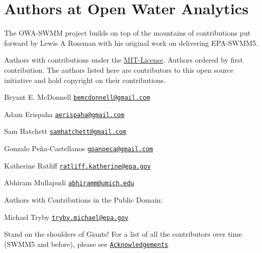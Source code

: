 \hypertarget{group___a_u_t_h_o_r_s}{}\section{Authors at Open Water Analytics}
\label{group___a_u_t_h_o_r_s}
The O\+W\+A-\/\+S\+W\+MM project builds on top of the mountains of contributions put forward by Lewis A Rossman with his original work on delivering E\+P\+A-\/\+S\+W\+M\+M5.

Authors with contributions under the \hyperlink{group___m_i_t-_license}{M\+I\+T-\/\+License}. Authors ordered by first contribution. The authors listed here are contributors to this open source initiative and hold copyright on their contributions.


\begin{DoxyItemize}
\item Bryant E. Mc\+Donnell \href{mailto:bemcdonnell@gmail.com}{\tt bemcdonnell@gmail.\+com}
\item Adam Erispaha \href{mailto:aerispaha@gmail.com}{\tt aerispaha@gmail.\+com}
\item Sam Hatchett \href{mailto:samhatchett@gmail.com}{\tt samhatchett@gmail.\+com}
\item Gonzalo Peña-\/\+Castellanos \href{mailto:goanpeca@gmail.com}{\tt goanpeca@gmail.\+com}
\item Katherine Ratliff \href{mailto:ratliff.katherine@epa.gov}{\tt ratliff.\+katherine@epa.\+gov}
\item Abhiram Mullapudi \href{mailto:abhiramm@umich.edu}{\tt abhiramm@umich.\+edu}
\end{DoxyItemize}

Authors with Contributions in the Public Domain\+:
\begin{DoxyItemize}
\item Michael Tryby \href{mailto:tryby.michael@epa.gov}{\tt tryby.\+michael@epa.\+gov}
\end{DoxyItemize}

Stand on the shoulders of Giants! For a list of all the contributors over time (S\+W\+M\+M5 and before), please see \href{https://github.com/OpenWaterAnalytics/Stormwater-Management-Model/wiki/Acknowledgements}{\tt Acknowledgements} 